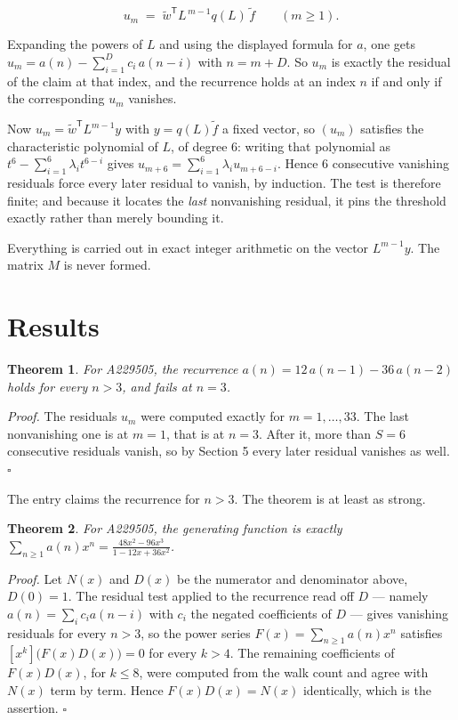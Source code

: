 \documentclass[11pt]{article}
\newtheorem{theorem}{Theorem}
\theoremstyle{definition}
\begin{document}
\[u_m \;=\; \tilde w^{\mathsf T} L^{\,m-1} q(L)\,\tilde f \qquad (m \ge 1).\]

Expanding the powers of $L$ and using the displayed formula for $a$, one gets $u_m = a(n) - \sum_{i=1}^{D} c_i\,a(n-i)$ with $n = m + D$. So $u_m$ is exactly the residual of the claim at that index, and the recurrence holds at an index $n$ if and only if the corresponding $u_m$ vanishes.

Now $u_m = \tilde w^{\mathsf T} L^{m-1} y$ with $y = q(L)\tilde f$ a fixed vector, so $(u_m)$ satisfies the characteristic polynomial of $L$, of degree $6$: writing that polynomial as $t^{6} - \sum_{i=1}^{6} \lambda_i t^{6-i}$ gives $u_{m+6} = \sum_{i=1}^{6} \lambda_i u_{m+6-i}$. Hence $6$ consecutive vanishing residuals force every later residual to vanish, by induction. The test is therefore finite; and because it locates the {\itshape last} nonvanishing residual, it pins the threshold exactly rather than merely bounding it.

Everything is carried out in exact integer arithmetic on the vector $L^{m-1}y$. The matrix $M$ is never formed.

\section{Results}

\begin{theorem} For A229505, the recurrence $a(n) = 12\,a(n-1) - 36\,a(n-2)$ holds for every $n > 3$, and fails at $n = 3$.\end{theorem}

{\itshape Proof.} The residuals $u_m$ were computed exactly for $m = 1,\dots,33$. The last nonvanishing one is at $m = 1$, that is at $n = 3$. After it, more than $S = 6$ consecutive residuals vanish, so by Section 5 every later residual vanishes as well. $\square$

The entry claims the recurrence for $n > 3$. The theorem is at least as strong.

\begin{theorem} For A229505, the generating function is exactly $\sum_{n\ge 1} a(n)x^n = \frac{48x^{2} - 96x^{3}}{1 - 12x + 36x^{2}}$.\end{theorem}

{\itshape Proof.} Let $N(x)$ and $D(x)$ be the numerator and denominator above, $D(0)=1$. The residual test applied to the recurrence read off $D$ --- namely $a(n) = \sum_i c_i a(n-i)$ with $c_i$ the negated coefficients of $D$ --- gives vanishing residuals for every $n > 3$, so the power series $F(x)=\sum_{n\ge 1}a(n)x^n$ satisfies $[x^k]\bigl(F(x)D(x)\bigr) = 0$ for every $k > 4$. The remaining coefficients of $F(x)D(x)$, for $k \le 8$, were computed from the walk count and agree with $N(x)$ term by term. Hence $F(x)D(x) = N(x)$ identically, which is the assertion. $\square$
\end{document}
